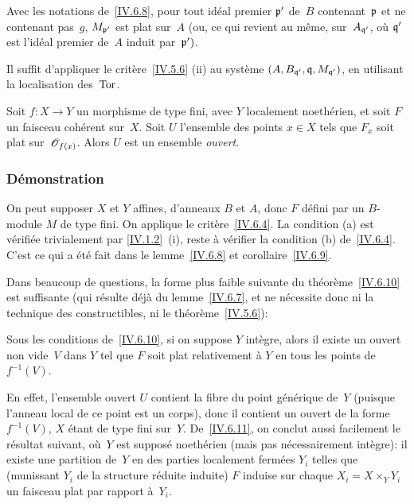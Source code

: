 \begin{corollaire}
\label{IV.6.9}
Avec les notations de~\ref{IV.6.8}, pour tout id\'eal premier
$\mathfrak{p}'$ de~$B$ contenant~$\mathfrak{p}$ et ne contenant pas~$g$,
$M_{\mathfrak{p}'}$ est plat sur~$A$ (ou, ce qui revient au m\^eme, sur~$A_{\mathfrak{q}'}$, o\`u $\mathfrak{q}'$ est l'id\'eal premier de~$A$
induit par~$\mathfrak{p}')$.
\end{corollaire}
Il suffit d'appliquer le crit\`ere~\ref{IV.5.6} (ii) au syst\`eme
$(A, B_{\mathfrak{q}'}, \mathfrak{q}, M_{\mathfrak{q'}})$, en utilisant la
localisation des~$\operatorname{Tor}$.
\begin{theoreme}
\label{IV.6.10}
Soit $f\colon X\to Y$ un morphisme de type fini, avec $Y$ localement
noeth\'erien, et soit $F$ un faisceau coh\'erent sur~$X$. Soit $U$
l'ensemble des points $x\in X$ tels que $F_x$ soit plat sur~$\cal{O}_{f(x)}$. Alors $U$ est un ensemble \emph{ouvert}.
\end{theoreme}

\subsubsection*{D\'emonstration} On peut supposer $X$ et $Y$ affines, d'anneaux $B$
et $A$, donc $F$ d\'efini par un $B$-module $M$ de type fini. On
applique le crit\`ere~\ref{IV.6.4}. La condition (a) est
v\'erifi\'ee trivialement par \ref{IV.1.2}~(i), reste \`a
v\'erifier la condition (b) de~\ref{IV.6.4}. C'est ce qui a
\'et\'e fait dans le lemme~\ref{IV.6.8} et
corollaire~\ref{IV.6.9}.

Dans beaucoup de questions, la forme plus faible suivante du
th\'eor\`eme~\ref{IV.6.10} est suffisante (qui r\'esulte
d\'ej\`a du lemme~\ref{IV.6.7}, et ne n\'ecessite donc ni la
technique
des constructibles, ni le th\'eor\`eme~\ref{IV.5.6}):
\begin{corollaire}
\label{IV.6.11}
Sous les conditions de~\ref{IV.6.10}, si on suppose $Y$ int\`egre,
alors il existe un ouvert non vide~$V$ dans $Y$ tel que $F$ soit plat
relativement \`a $Y$ en tous les points de~$f^{-1}(V)$.
\end{corollaire}
En effet, l'ensemble ouvert $U$ contient la fibre du point
g\'en\'erique de~$Y$ (puisque l'anneau local de ce point est un
corps), donc il contient un ouvert de la forme $f^{-1}(V)$, $X$
\'etant de type fini sur~$Y$. De~\ref{IV.6.11}, on conclut aussi
facilement le r\'esultat suivant, o\`u~$Y$ est suppos\'e
noeth\'erien (mais pas n\'ecessairement int\`egre): il existe
une partition de~$Y$ en des parties localement ferm\'ees $Y_i$
telles que (munissant $Y_i$ de la structure r\'eduite induite) $F$
induise sur chaque $X_i=X\times_Y Y_i$ un faisceau plat par rapport
\`a~$Y_i$.

